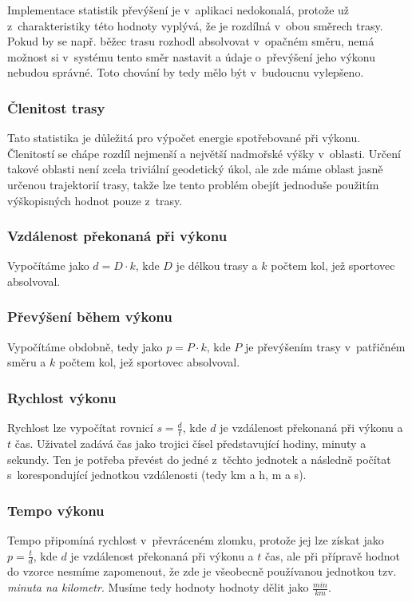 Implementace statistik převýšení je v~aplikaci nedokonalá, protože už
z~charakteristiky této hodnoty vyplývá, že je rozdílná v~obou směrech
trasy. Pokud by se např. běžec trasu rozhodl absolvovat v~opačném
směru, nemá možnost si v~systému tento směr nastavit a údaje
o~převýšení jeho výkonu nebudou správné. Toto chování by tedy mělo
být v~budoucnu vylepšeno.

\subsubsection{Členitost trasy}
Tato statistika je důležitá pro výpočet energie spotřebované při
výkonu. Členitostí se chápe rozdíl nej\-menší a nej\-větší nadmořské
výšky v~oblasti. Určení takové oblasti není zcela triviální
geodetický úkol, ale zde máme oblast jasně určenou trajektorií trasy,
takže lze tento problém obejít jednoduše použitím výškopisných hodnot
pouze z~trasy.

\subsubsection{Vzdálenost překonaná při výkonu}
Vypočítáme jako $d = D \cdot k$, kde $D$ je délkou
trasy a $k$ počtem kol, jež sportovec absolvoval.

\subsubsection{Převýšení během výkonu}
Vypočítáme obdobně, tedy jako $p = P \cdot k$, kde $P$
je převýšením trasy v~patřičném směru a $k$ počtem kol, jež
sportovec absolvoval.

\subsubsection{Rychlost výkonu}
Rychlost lze vypočítat rovnicí $s = \frac{d}{t}$, kde $d$
je vzdálenost překonaná při výkonu a $t$ čas. Uživatel
zadává čas jako trojici čísel představující hodiny, minuty a sekundy. Ten je potřeba
převést do jedné z~těchto jednotek a následně počítat
s~korespondující jednotkou vzdálenosti (tedy km a h, m a s).

\subsubsection{Tempo výkonu}
Tempo připomíná rychlost v~převráceném zlomku, protože jej lze
získat jako $p = \frac{t}{d}$, kde $d$ je vzdálenost
překonaná při výkonu a $t$ čas, ale při přípravě hodnot do
vzorce nesmíme zapomenout, že zde je všeobecně používanou jednotkou
tzv. {\it minuta na kilometr}. Musíme tedy hodnoty hodnoty dělit jako
$\frac{min}{km}$.

